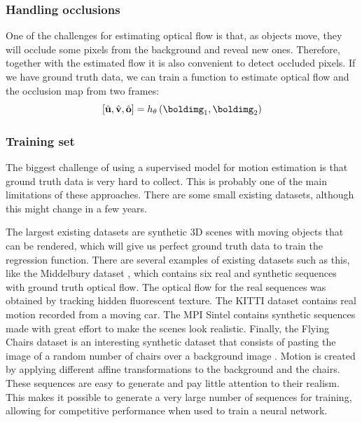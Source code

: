 \subsubsection{Handling occlusions}
One of the challenges for estimating optical flow is that, as objects move, they will occlude some pixels from the background and reveal new ones. Therefore, together with the estimated flow it is also convenient to detect occluded pixels. If we have ground truth data, we can train a function to estimate optical flow and the occlusion map from two frames:
\begin{equation}
\left[ \hat{\mathbf{u}}, \hat{\mathbf{v}}, \hat{\mathbf{o}} \right] = 
h_\theta \left( \boldimg_1, \boldimg_2 \right)
\end{equation}

\subsubsection{Training set}
The biggest challenge of using a supervised model for motion estimation is that ground truth data is very hard to collect. This is probably one of the main limitations of these approaches. There are some small existing datasets, although this might change in a few years. 

The largest existing datasets are synthetic 3D scenes with moving objects that can be rendered, which will give us perfect ground truth data to train the regression function. There are several examples of existing datasets such as this, like the Middelbury dataset \cite{Scharstein2002}, which contains six real and synthetic sequences with ground truth optical flow. The optical flow for the real sequences was obtained by tracking hidden fluorescent texture. 
The KITTI dataset \cite{Geiger2013} contains real motion recorded from a moving car. The MPI Sintel \cite{Butler:ECCV:2012} contains synthetic sequences made with great effort to make the scenes look realistic. Finally, the Flying Chairs dataset is an interesting synthetic dataset that consists of pasting the image of a random number of chairs over a background image \cite{Dosovitskiy2015}. Motion is created by applying different affine transformations to the background and the chairs. These sequences are easy to generate and pay little attention to their realism. This makes it possible to generate a very large number of sequences for training, allowing for competitive performance when used to train a neural network. 

